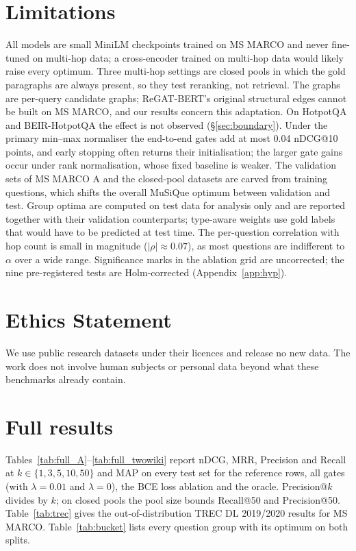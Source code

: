 \documentclass[11pt]{article}
\begin{document}
\section*{Limitations}
All models are small MiniLM checkpoints trained on MS MARCO and never fine-tuned on multi-hop data; a
cross-encoder trained on multi-hop data would likely raise every optimum. Three multi-hop settings are closed
pools in which the gold paragraphs are always present, so they test reranking, not retrieval. The graphs are
per-query candidate graphs; ReGAT-BERT's original structural edges cannot be built on MS MARCO, and our results
concern this adaptation. On HotpotQA and BEIR-HotpotQA the effect is not observed (\S\ref{sec:boundary}).
Under the primary min--max normaliser the end-to-end gates add at most 0.04 nDCG@10 points, and early stopping
often returns their initialisation; the larger gate gains occur under rank normalisation, whose fixed baseline is
weaker. The validation sets of MS MARCO A and the closed-pool datasets are carved from training questions, which
shifts the overall MuSiQue optimum between validation and test. Group optima are computed on test data for
analysis only and are reported together with their validation counterparts; type-aware weights use gold labels that
would have to be predicted at test time. The per-question correlation with hop count is small in magnitude
($|\rho|\approx0.07$), as most questions are indifferent to $\alpha$ over a wide range. Significance marks in the
ablation grid are uncorrected; the nine pre-registered tests are Holm-corrected (Appendix~\ref{app:hyp}).

\section*{Ethics Statement}
We use public research datasets under their licences and release no new data. The work does not involve human
subjects or personal data beyond what these benchmarks already contain.



\clearpage
\appendix

\section{Full results}
\label{app:full}
Tables~\ref{tab:full_A}--\ref{tab:full_twowiki} report nDCG, MRR, Precision and Recall at $k\in\{1,3,5,10,50\}$
and MAP on every test set for the reference rows, all gates (with $\lambda=0.01$ and $\lambda=0$), the BCE loss
ablation and the oracle. Precision@$k$ divides by $k$; on closed pools the pool size bounds Recall@50 and
Precision@50. Table~\ref{tab:trec} gives the out-of-distribution TREC DL 2019/2020 results
\citep{craswell2020trec,craswell2021trec} for MS MARCO. Table~\ref{tab:bucket} lists every question group with its
optimum on both splits.
\end{document}

